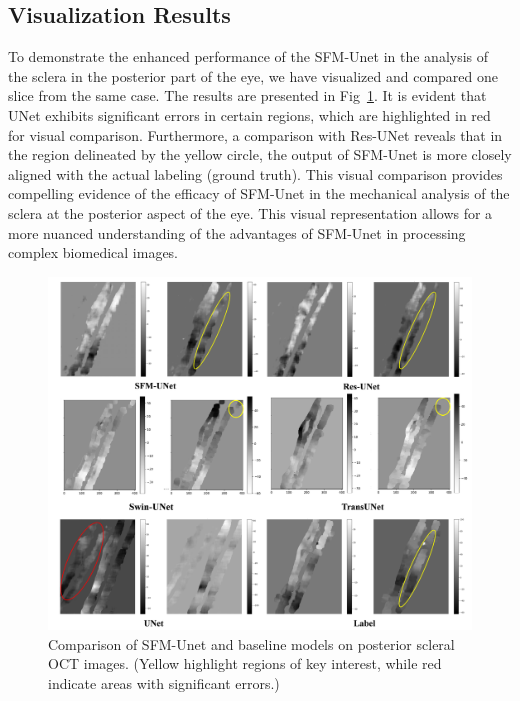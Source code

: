 \documentclass[AMA,Times1COL]{WileyNJDv5} %
\begin{document}
\subsection{Visualization Results}
To demonstrate the enhanced performance of the SFM-Unet in the analysis of the sclera in the posterior part of the eye, we have visualized and compared one slice from the same case. The results are presented in Fig~\ref{fig:3}. It is evident that UNet exhibits significant errors in certain regions, which are highlighted in red for visual comparison. Furthermore, a comparison with Res-UNet reveals that in the region delineated by the yellow circle, the output of SFM-Unet is more closely aligned with the actual labeling (ground truth). This visual comparison provides compelling evidence of the efficacy of SFM-Unet in the mechanical analysis of the sclera at the posterior aspect of the eye. This visual representation allows for a more nuanced understanding of the advantages of SFM-Unet in processing complex biomedical images.
\begin{figure}[htbp]
\centerline{\includegraphics[width=0.9\linewidth]{Fig/fig3.png}}
\caption{Comparison of SFM-Unet and baseline models on posterior scleral OCT images. (Yellow highlight regions of key interest, while red indicate areas with significant errors.)}
\label{fig:3}
\end{figure}
\end{document}
